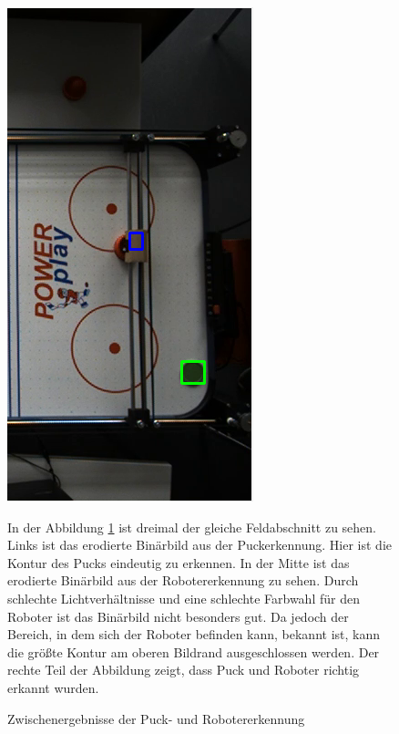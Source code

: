 \begin{figure} [h]
\begin{minipage}[t]{0.25\textwidth}
\end{minipage}
\hspace{0.05\textwidth}
\begin{minipage}[t]{0.25\textwidth}
\vspace{0pt}
\includegraphics[scale =0.45]{images/detect}
\end{minipage}

 \caption{Zwischenergebnisse der Puck- und Robotererkennung}
 \label{bv_process}
\vspace{5pt}
In der Abbildung \ref{bv_process} ist dreimal der gleiche Feldabschnitt zu sehen. Links ist das erodierte Binärbild aus der Puckerkennung. Hier ist die Kontur des Pucks eindeutig zu erkennen. In der Mitte ist das erodierte Binärbild aus der Robotererkennung zu sehen. Durch schlechte Lichtverhältnisse und eine schlechte Farbwahl für den Roboter ist das Binärbild nicht besonders gut. Da jedoch der Bereich, in dem sich der Roboter befinden kann, bekannt ist, kann die größte Kontur am oberen Bildrand ausgeschlossen werden. Der rechte Teil der Abbildung zeigt, dass Puck und Roboter richtig erkannt wurden.
\end{figure}

\clearpage
